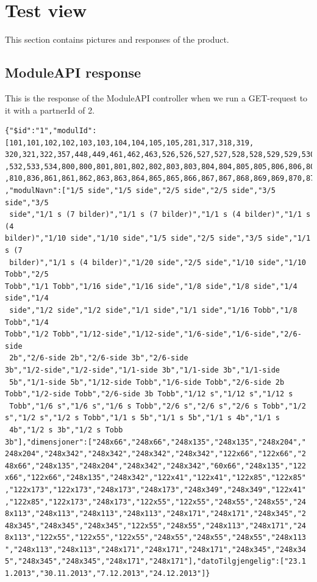 
\chapter{Test view}
This section contains pictures and responses of the product.
\newpage

\section{ModuleAPI response}
This is the response of the ModuleAPI controller when we run a GET-request to it with a partnerId of 2.
\begin{verbatim}
{"$id":"1","modulId":[101,101,102,102,103,103,104,104,105,105,281,317,318,319,
320,321,322,357,448,449,461,462,463,526,526,527,527,528,528,529,529,530,530,531
,532,533,534,800,800,801,801,802,802,803,803,804,804,805,805,806,806,807,808,809
,810,836,861,861,862,863,863,864,865,865,866,867,867,868,869,869,870,870,974,975]
,"modulNavn":["1/5 side","1/5 side","2/5 side","2/5 side","3/5 side","3/5
 side","1/1 s (7 bilder)","1/1 s (7 bilder)","1/1 s (4 bilder)","1/1 s (4
bilder)","1/10 side","1/10 side","1/5 side","2/5 side","3/5 side","1/1 s (7
 bilder)","1/1 s (4 bilder)","1/20 side","2/5 side","1/10 side","1/10 Tobb","2/5
Tobb","1/1 Tobb","1/16 side","1/16 side","1/8 side","1/8 side","1/4 side","1/4
 side","1/2 side","1/2 side","1/1 side","1/1 side","1/16 Tobb","1/8 Tobb","1/4
Tobb","1/2 Tobb","1/12-side","1/12-side","1/6-side","1/6-side","2/6-side
 2b","2/6-side 2b","2/6-side 3b","2/6-side
3b","1/2-side","1/2-side","1/1-side 3b","1/1-side 3b","1/1-side
 5b","1/1-side 5b","1/12-side Tobb","1/6-side Tobb","2/6-side 2b
Tobb","1/2-side Tobb","2/6-side 3b Tobb","1/12 s","1/12 s","1/12 s
 Tobb","1/6 s","1/6 s","1/6 s Tobb","2/6 s","2/6 s","2/6 s Tobb","1/2
s","1/2 s","1/2 s Tobb","1/1 s 5b","1/1 s 5b","1/1 s 4b","1/1 s
 4b","1/2 s 3b","1/2 s Tobb
3b"],"dimensjoner":["248x66","248x66","248x135","248x135","248x204","
248x204","248x342","248x342","248x342","248x342","122x66","122x66","2
48x66","248x135","248x204","248x342","248x342","60x66","248x135","122
x66","122x66","248x135","248x342","122x41","122x41","122x85","122x85"
,"122x173","122x173","248x173","248x173","248x349","248x349","122x41"
,"122x85","122x173","248x173","122x55","122x55","248x55","248x55","24
8x113","248x113","248x113","248x113","248x171","248x171","248x345","2
48x345","248x345","248x345","122x55","248x55","248x113","248x171","24
8x113","122x55","122x55","122x55","248x55","248x55","248x55","248x113
","248x113","248x113","248x171","248x171","248x171","248x345","248x34
5","248x345","248x345","248x171","248x171"],"datoTilgjengelig":["23.1
1.2013","30.11.2013","7.12.2013","24.12.2013"]}
\end{verbatim}
\newpage
